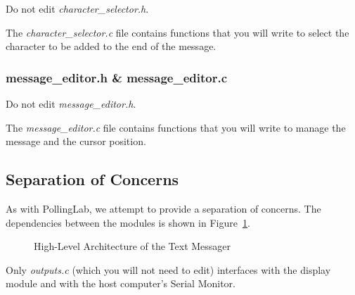 Do not edit \textit{character\_selector.h}.

The \textit{character\_selector.c} file contains functions that you will write to select the character to be added to the end of the message.

\subsubsection{message\_editor.h \& message\_editor.c}

Do not edit \textit{message\_editor.h}.

The \textit{message\_editor.c} file contains functions that you will write to manage the message and the cursor position.


\subsection{Separation of Concerns}

As with PollingLab, we attempt to provide a separation of concerns.
The dependencies between the modules is shown in Figure~\ref{fig:architecture}.

\begin{figure}
    \centering
    \caption{High-Level Architecture of the Text Messager} \label{fig:architecture}
\end{figure}

Only \textit{outputs.c} (which you will not need to edit) interfaces with the display module and with the host computer's Serial Monitor.

